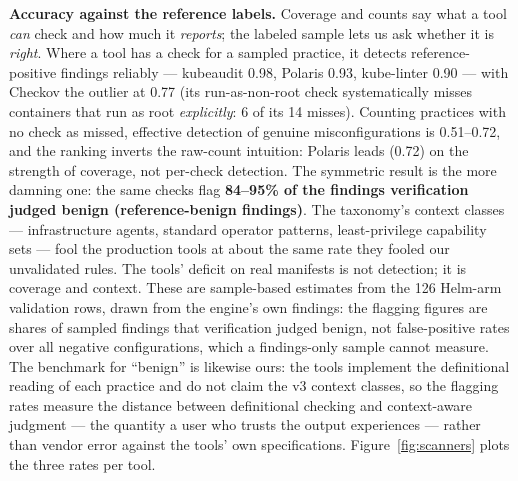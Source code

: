 \documentclass[pdflatex,sn-basic]{sn-jnl}
\begin{document}
\textbf{Accuracy against the reference labels.} Coverage and counts say
what a tool \emph{can} check and how much it \emph{reports}; the
labeled sample lets us ask whether it is \emph{right}. Where a tool has
a check for a sampled practice, it detects reference-positive findings
reliably --- kubeaudit 0.98, Polaris 0.93, kube-linter 0.90 --- with
Checkov the outlier at 0.77 (its run-as-non-root check systematically misses containers that run as root \emph{explicitly}: 6 of its 14 misses). Counting practices with no check as missed, effective detection
of genuine misconfigurations is 0.51--0.72, and the ranking inverts the raw-count intuition: Polaris leads (0.72) on the strength of coverage,
not per-check detection. The symmetric result is the more damning one:
the same checks flag \textbf{84--95\% of the findings verification
judged benign (reference-benign findings)}. The taxonomy's context classes ---
infrastructure agents, standard operator patterns, least-privilege
capability sets --- fool the production tools at about the same rate
they fooled our unvalidated rules. The tools' deficit on real manifests
is not detection; it is coverage and context. These are sample-based
estimates from the 126 Helm-arm validation rows, drawn from the engine's
own findings: the flagging figures are shares of sampled findings that
verification judged benign, not false-positive rates over all negative
configurations, which a findings-only sample cannot measure. The
benchmark for ``benign'' is likewise ours: the tools implement the
definitional reading of each practice and do not claim the v3 context
classes, so the flagging rates measure the distance between definitional
checking and context-aware judgment --- the quantity a user who trusts
the output experiences --- rather than vendor error against the tools'
own specifications.
Figure~\ref{fig:scanners} plots the three rates per tool.
\end{document}
